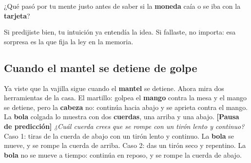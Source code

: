 \documentclass[
  spanish,
  letterpaper,
  12pt,
  oneside,
  open=any,
  DIV=15]{scrbook}
\begin{document}
\begin{tcolorbox}[enhanced jigsaw, arc=.35mm, bottomrule=.15mm, bottomtitle=1mm, breakable, colback=white, colbacktitle=quarto-callout-note-color!10!white, colframe=quarto-callout-note-color-frame, coltitle=black, left=2mm, leftrule=.75mm, opacityback=0, opacitybacktitle=0.6, rightrule=.15mm, title=\textcolor{quarto-callout-note-color}{\faInfo}\hspace{0.5em}{Pregunta socioemocional}, titlerule=0mm, toprule=.15mm, toptitle=1mm]

¿Qué pasó por tu mente justo antes de saber si la
\textcolor[HTML]{7C3AED}{\textbf{moneda}} caía o se iba con la
\textcolor[HTML]{2563EB}{\textbf{tarjeta}}?

\end{tcolorbox}

\begin{tcolorbox}[enhanced jigsaw, arc=.35mm, bottomrule=.15mm, bottomtitle=1mm, breakable, colback=white, colbacktitle=quarto-callout-tip-color!10!white, colframe=quarto-callout-tip-color-frame, coltitle=black, left=2mm, leftrule=.75mm, opacityback=0, opacitybacktitle=0.6, rightrule=.15mm, title=\textcolor{quarto-callout-tip-color}{\faLightbulb}\hspace{0.5em}{Sobre la pregunta socioemocional}, titlerule=0mm, toprule=.15mm, toptitle=1mm]

Si predijiste bien, tu intuición ya entendía la idea. Si fallaste, no
importa: esa sorpresa es la que fija la ley en la memoria.

\end{tcolorbox}

\subsection{Cuando el mantel se detiene de
golpe}\label{cuando-el-mantel-se-detiene-de-golpe}

Ya viste que la vajilla sigue cuando el
\textcolor[HTML]{2563EB}{\textbf{mantel}} se detiene. Ahora mira dos
herramientas de la casa. El martillo: golpea el
\textcolor[HTML]{2563EB}{\textbf{mango}} contra la mesa y el mango se
detiene, pero la \textcolor[HTML]{7C3AED}{\textbf{cabeza}} no: continúa
hacia abajo y se aprieta contra el mango. La
\textcolor[HTML]{7C3AED}{\textbf{bola}} colgada lo muestra con dos
\textcolor[HTML]{2563EB}{\textbf{cuerdas}}, una arriba y una abajo.
\textbf{{[}Pausa de predicción{]}} \emph{¿Cuál cuerda crees que se rompe
con un tirón lento y continuo?} Caso 1: tiras de la cuerda de abajo con
un tirón lento y continuo. La \textcolor[HTML]{7C3AED}{\textbf{bola}} se
mueve, y se rompe la cuerda de arriba. Caso 2: das un tirón seco y
repentino. La \textcolor[HTML]{7C3AED}{\textbf{bola}} no se mueve a
tiempo: continúa en reposo, y se rompe la cuerda de abajo.
\end{document}
